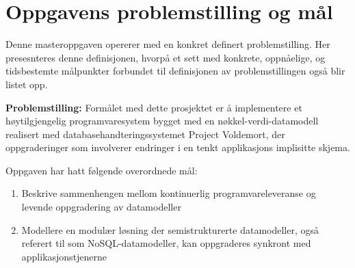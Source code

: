 \section{Oppgavens problemstilling og mål}

Denne masteroppgaven opererer med en konkret definert problemstilling. Her presesnteres denne definisjonen, hvorpå et sett med konkrete, oppnåelige, og tidsbestemte målpunkter forbundet til definisjonen av problemstillingen også blir listet opp.

\textbf{Problemstilling:} Formålet med dette prosjektet er å implementere et høytilgjengelig programvaresystem bygget med en nøkkel-verdi-datamodell realisert med databasehandteringssystemet Project Voldemort, der oppgraderinger som involverer endringer i en tenkt applikasjons implisitte skjema.

Oppgaven har hatt følgende overordnede mål:

\begin{enumerate}
  \item Beskrive sammenhengen mellom kontinuerlig programvareleveranse og \\ levende oppgradering av datamodeller %
  \item Modellere en modulær løsning der semistrukturerte datamodeller, også referert til som NoSQL-datamodeller, kan oppgraderes synkront med applikasjonstjenerne
\end{enumerate}




